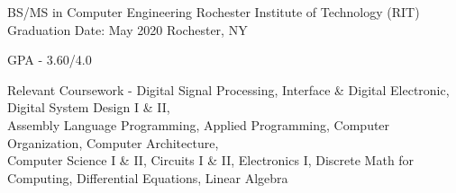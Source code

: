 \smallskip
\begin{cventries}
  \cventry
    {BS/MS in Computer Engineering}
	{Rochester Institute of Technology (RIT)}
    {Graduation Date: May 2020}
    {Rochester, NY}
    {
      \begin{cvitems}
	  \item {GPA - 3.60/4.0}
	  \item {Relevant Coursework - Digital Signal Processing, Interface \& Digital Electronic, Digital System Design I \& II, \\Assembly Language Programming, Applied Programming, Computer Organization, Computer Architecture, \\Computer Science I \& II, Circuits I \& II, Electronics I, Discrete Math for Computing, Differential Equations, Linear Algebra}
      \end{cvitems}
    }
\end{cventries}
